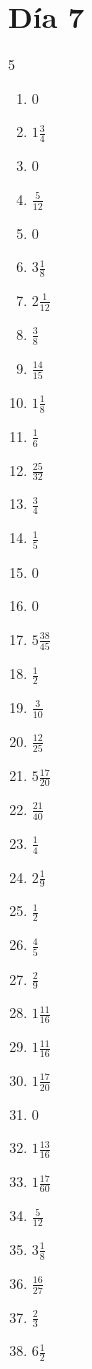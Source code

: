 \documentclass[12pt]{article}
\begin{document}
\section*{Día 7}
\begin{multicols}{5}\begin{enumerate}
\item $ 0 $
\item $ 1 \frac{3}{4} $
\item $ 0 $
\item $ \frac{5}{12} $
\item $ 0 $
\item $ 3 \frac{1}{8} $
\item $ 2 \frac{1}{12} $
\item $ \frac{3}{8} $
\item $ \frac{14}{15} $
\item $ 1 \frac{1}{8} $
\item $ \frac{1}{6} $
\item $ \frac{25}{32} $
\item $ \frac{3}{4} $
\item $ \frac{1}{5} $
\item $ 0 $
\item $ 0 $
\item $ 5 \frac{38}{45} $
\item $ \frac{1}{2} $
\item $ \frac{3}{10} $
\item $ \frac{12}{25} $
\item $ 5 \frac{17}{20} $
\item $ \frac{21}{40} $
\item $ \frac{1}{4} $
\item $ 2 \frac{1}{9} $
\item $ \frac{1}{2} $
\item $ \frac{4}{5} $
\item $ \frac{2}{9} $
\item $ 1 \frac{11}{16} $
\item $ 1 \frac{11}{16} $
\item $ 1 \frac{17}{20} $
\item $ 0 $
\item $ 1 \frac{13}{16} $
\item $ 1 \frac{17}{60} $
\item $ \frac{5}{12} $
\item $ 3 \frac{1}{8} $
\item $ \frac{16}{27} $
\item $ \frac{2}{3} $
\item $ 6 \frac{1}{2} $

\end{enumerate}
\end{multicols}
\end{document}

